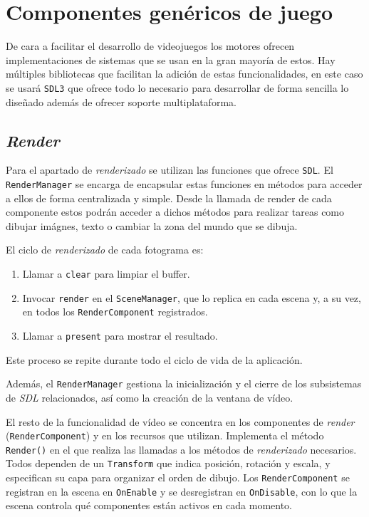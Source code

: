 \section{Componentes genéricos de juego}
De cara a facilitar el desarrollo de videojuegos los motores ofrecen implementaciones de sistemas que se usan en la gran mayoría de estos. Hay múltiples bibliotecas que facilitan la adición de estas funcionalidades, en este caso se usará \texttt{SDL3} que ofrece todo lo necesario para desarrollar de forma sencilla lo diseñado además de ofrecer soporte multiplataforma.

\subsection{\textit{Render}}
Para el apartado de \textit{renderizado} se utilizan las funciones que ofrece \texttt{SDL}. El \texttt{RenderManager} se encarga de encapsular estas funciones en métodos para acceder a ellos de forma centralizada y simple. Desde la llamada de render de cada componente estos podrán acceder a dichos métodos para realizar tareas como dibujar imágnes, texto o cambiar la zona del mundo que se dibuja.

El ciclo de \textit{renderizado} de cada fotograma es: 
\begin{enumerate}
	\item Llamar a \texttt{clear} para limpiar el buffer.
	\item Invocar \texttt{render} en el \texttt{SceneManager}, que lo replica en cada escena y, a su vez, en todos los \texttt{RenderComponent} registrados. 
	\item Llamar a \texttt{present} para mostrar el resultado.
\end{enumerate}

Este proceso se repite durante todo el ciclo de vida de la aplicación.

\medskip	

Además, el \texttt{RenderManager} gestiona la inicialización y el cierre de los subsistemas de \textit{SDL} relacionados, así como la creación de la ventana de vídeo.

\medskip

El resto de la funcionalidad de vídeo se concentra en los componentes de \textit{render} (\texttt{RenderComponent}) y en los recursos que utilizan. Implementa el método \texttt{Render()} en el que realiza las llamadas a los métodos de \textit{renderizado} necesarios. Todos dependen de un \texttt{Transform} que indica posición, rotación y escala, y especifican su capa para organizar el orden de dibujo. Los \texttt{RenderComponent} se registran en la escena en \texttt{OnEnable} y se desregistran en \texttt{OnDisable}, con lo que la escena controla qué componentes están activos en cada momento.  

